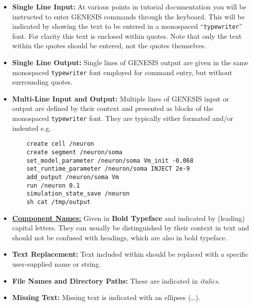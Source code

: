 \documentclass[12pt]{article}
\begin{document}
\begin{itemize}

\item {\bf Single Line Input:} At various points in tutorial documentation you will be instructed to enter GENESIS commands through the keyboard. This will be indicated by showing the text to be entered in a monospaced ``{\tt typewriter}'' font. For clarity this text is enclosed within quotes. Note that only the text within the quotes should be entered, not the quotes themselves.

\item {\bf Single Line Output:} Single lines of GENESIS output are given in the same monospaced {\tt typewriter} font employed for command entry, but without surrounding quotes.

\item {\bf Multi-Line Input and Output:} Multiple lines of GENESIS input or output are defined by their context and presented as blocks of the monospaced {\tt typewriter} font. They are typically either formated and/or indented e.g.

\begin{verbatim}
    create cell /neuron
    create segment /neuron/soma
    set_model_parameter /neuron/soma Vm_init -0.068
    set_runtime_parameter /neuron/soma INJECT 2e-9
    add_output /neuron/soma Vm
    run /neuron 0.1
    simulation_state_save /neuron
    sh cat /tmp/output
\end{verbatim}

\item \href{../reserved-words/reserved-words.tex}{\bf Component Names:} Given in {\bf Bold Typeface} and indicated by (leading) capital letters. They can usually be distinguished by their context in text and should not be confused with headings, which are also in bold typeface.

\item {\bf Text Replacement:} Text included within {\tt <angle brackets>} should be replaced with a specific user-supplied name or string.

\item {\bf File Names and Directory Paths:} These are indicated in {\it italics}.

\item {\bf Missing Text:} Missing text is indicated with an ellipses (\ldots).

\end{itemize}
\end{document}
